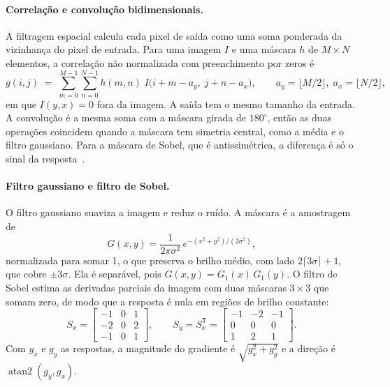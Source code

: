 \paragraph{Correlação e convolução bidimensionais.}
A filtragem espacial calcula cada pixel de saída como uma soma ponderada da vizinhança do pixel de entrada. Para uma imagem $I$ e uma máscara $h$ de $M\times N$ elementos, a correlação não normalizada com preenchimento por zeros é
\begin{equation}
g(i,j) \;=\; \sum_{m=0}^{M-1}\sum_{n=0}^{N-1} h(m,n)\; I\bigl(i+m-a_y,\; j+n-a_x\bigr),
\qquad a_y = \lfloor M/2\rfloor,\; a_x = \lfloor N/2\rfloor,
\label{eq:correlacao}
\end{equation}
em que $I(y,x)=0$ fora da imagem. A saída tem o mesmo tamanho da entrada. A convolução é a mesma soma com a máscara girada de $180^\circ$, então as duas operações coincidem quando a máscara tem simetria central, como a média e o filtro gaussiano. Para a máscara de Sobel, que é antissimétrica, a diferença é só o sinal da resposta~\cite{gonzalez2018}.

\paragraph{Filtro gaussiano e filtro de Sobel.}
O filtro gaussiano suaviza a imagem e reduz o ruído. A máscara é a amostragem de
\begin{equation}
G(x,y) = \frac{1}{2\pi\sigma^2}\, e^{-(x^2+y^2)/(2\sigma^2)},
\end{equation}
normalizada para somar 1, o que preserva o brilho médio, com lado $2\lceil 3\sigma\rceil+1$, que cobre $\pm 3\sigma$. Ela é separável, pois $G(x,y)=G_1(x)\,G_1(y)$. O filtro de Sobel estima as derivadas parciais da imagem com duas máscaras $3\times 3$ que somam zero, de modo que a resposta é nula em regiões de brilho constante:
\begin{equation}
S_x=\begin{bmatrix}-1&0&1\\-2&0&2\\-1&0&1\end{bmatrix},\qquad
S_y=S_x^{\mathsf T}=\begin{bmatrix}-1&-2&-1\\0&0&0\\1&2&1\end{bmatrix}.
\end{equation}
Com $g_x$ e $g_y$ as respostas, a magnitude do gradiente é $\sqrt{g_x^2+g_y^2}$ e a direção é $\operatorname{atan2}(g_y,g_x)$.

